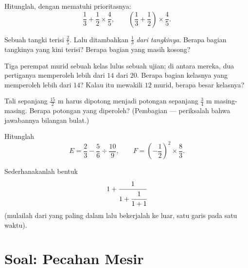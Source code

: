 \begin{exercise}[$\star$]\label{exo:g8:fractions:7}
Hitunglah, dengan mematuhi prioritasnya:
\[
\frac{1}{3} + \frac{1}{2} \times \frac{4}{5},
\qquad
\left(\frac{1}{3} + \frac{1}{2}\right) \times \frac{4}{5} .
\]
\end{exercise}

\begin{exercise}[$\star\star$]\label{exo:g8:fractions:8}
Sebuah tangki terisi $\frac{2}{5}$. Lalu ditambahkan $\frac{1}{3}$
\emph{dari  tangkinya}. Berapa bagian tangkinya yang kini
terisi? Berapa bagian yang masih kosong?
\end{exercise}

\begin{exercise}[$\star\star$]\label{exo:g8:fractions:9}
Tiga perempat murid sebuah kelas lulus sebuah ujian; di antara mereka,
dua pertiganya memperoleh lebih dari $14$ dari $20$. Berapa bagian
kelasnya yang memperoleh lebih dari $14$? Kalau itu mewakili $12$
murid, berapa besar kelasnya?
\end{exercise}

\begin{exercise}[$\star\star$]\label{exo:g8:fractions:10}
Tali sepanjang $\frac{15}{2}$ m harus dipotong menjadi potongan
sepanjang $\frac{3}{4}$ m masing-masing. Berapa potongan yang
diperoleh? (Pembagian  --- periksalah bahwa jawabannya
bilangan bulat.)
\end{exercise}

\begin{exercise}[$\star\star$]\label{exo:g8:fractions:11}
Hitunglah
\[
E = \frac{2}{3} - \frac{5}{6} \div \frac{10}{9},
\qquad
F = \left(-\frac{1}{2}\right)^2 \times \frac{8}{3} .
\]
\end{exercise}

\begin{exercise}[$\star\star\star$]\label{exo:g8:fractions:12}
Sederhanakanlah bentuk
\[
1 + \cfrac{1}{1 + \cfrac{1}{1 + 1}}
\]
(mulailah dari  yang paling dalam lalu bekerjalah ke luar,
satu garis pada satu waktu).
\end{exercise}

\section{Soal: Pecahan Mesir}

